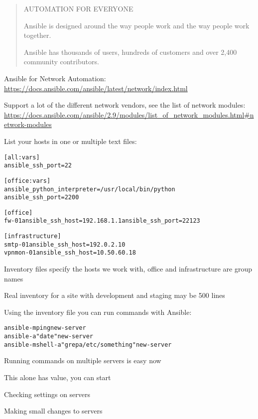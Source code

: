 \documentclass[Screen16to9,17pt]{foils}
\begin{document}

\begin{quote}\small
AUTOMATION FOR EVERYONE

Ansible is designed around the way people work and the way people work together.

Ansible has thousands of users, hundreds of customers and over 2,400 community contributors.
\end{quote}

Ansible for Network Automation:
\url{https://docs.ansible.com/ansible/latest/network/index.html}

Support a lot of the different network vendors, see the list of network modules:\\
\url{https://docs.ansible.com/ansible/2.9/modules/list_of_network_modules.html#network-modules}



List your hosts in one or multiple text files:
\begin{alltt}\footnotesize
[all:vars]
ansible_ssh_port=22

[office:vars]
ansible_python_interpreter=/usr/local/bin/python
ansible_ssh_port=2200

[office]
fw-01 ansible_ssh_host=192.168.1.1 ansible_ssh_port=22123

[infrastructure]
smtp-01     ansible_ssh_host=192.0.2.10
vpnmon-01   ansible_ssh_host=10.50.60.18

\end{alltt}

\begin{list2}
\item Inventory files specify the hosts we work with, office and infrastructure are group names
\item Real inventory for a site with development and staging may be 500 lines
\end{list2}



Using the inventory file you can run commands with Ansible:

\begin{alltt}\footnotesize
  ansible -m ping new-server
  ansible -a "date" new-server
  ansible -m shell -a "grep a /etc/something" new-server
\end{alltt}

\begin{list2}
\item Running commands on multiple servers is easy now
\item This alone has value, you can start
\item Checking settings on servers
\item Making small changes to servers
\end{list2}
\end{document}
